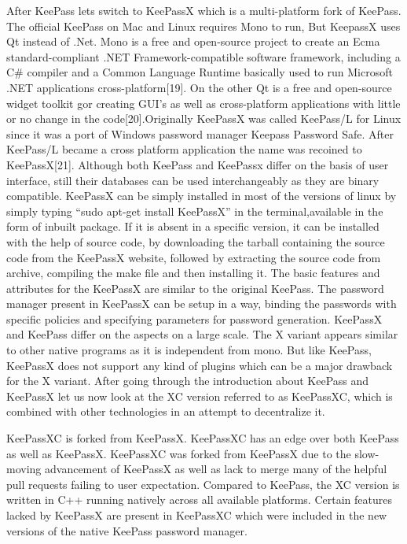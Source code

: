 \documentclass[12pt]{article}
\begin{document}
After KeePass lets switch to KeePassX which is a multi-platform fork of KeePass. The official KeePass on Mac and Linux requires Mono  to run, But KeepassX uses Qt instead of .Net. Mono is a free and open-source project to create an Ecma standard-compliant .NET Framework-compatible software framework, including a C# compiler and a Common Language Runtime basically used to run Microsoft .NET applications cross-platform[19]. On the other Qt is a free and open-source widget toolkit gor creating GUI’s as well as cross-platform applications with little or no change in the code[20].Originally KeePassX was called KeePass/L for Linux since it was a port of Windows password manager Keepass Password Safe. After KeePass/L became a cross platform application the name was recoined to KeePassX[21]. Although both KeePass and KeePassx differ on the basis of  user interface, still their databases can be used interchangeably as they are binary compatible. KeePassX can be simply installed in most of the versions of linux by simply typing “sudo apt-get install KeePassX” in the terminal,available in the form of inbuilt package. If it is absent in a specific version, it can be installed with the help of source code, by downloading the tarball containing the source code from the KeePassX website, followed by extracting the source code from archive, compiling the make file and then installing it. The basic features and attributes for the KeePassX are similar to the original KeePass. The password manager present in KeePassX can be setup in a way, binding the passwords with specific policies and specifying parameters for password generation. KeePassX and KeePass differ on the aspects on a large scale. The X variant appears similar to other native programs as it is independent from mono. But like KeePass, KeePassX does not support any kind of plugins which can be a major drawback for the X variant. After going through the introduction about KeePass and KeePassX let us now look at the XC version referred to as KeePassXC, which is combined with other technologies in an attempt to decentralize it. 

\bigskip

KeePassXC is forked from KeePassX. KeePassXC has an edge over both  KeePass as well as KeePassX. KeePassXC was forked from KeePassX due to the slow-moving advancement  of KeePassX as well as lack to merge many of the helpful pull requests failing to user expectation. Compared to KeePass, the XC version is written in C++ running natively across all available platforms. Certain features lacked by KeePassX are present in KeePassXC which were included in the new versions of the native KeePass password manager.
\end{document}
